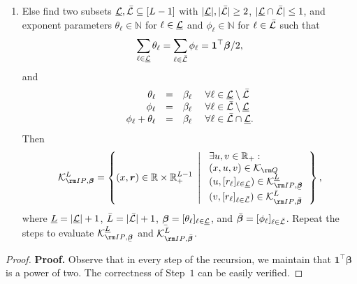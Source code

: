 \documentclass[mnsc, nonblindrev]{informswp}
\newcommand{\1}[1]{\mathds{1}{\left(#1\right)}}
\begin{document}
\begin{appendices}
\begin{theorem}
\begin{enumerate}[Step 1.]
\item Else find two subsets $\underline {\mathcal{L}}, \bar {\mathcal{L}}  \subseteq [L-1]$ with $|\underline {\mathcal{L}}|, |\bar {\mathcal{L}}| \geq 2$, $|\underline {\mathcal{L}} \cap \bar {\mathcal{L}}| \leq 1$, and exponent parameters $\theta_\ell \in \mathbb{N}$ for $\ell \in \underline {\mathcal{L}}$ and $\phi_\ell \in \mathbb{N}$ for $\ell \in \bar {\mathcal{L}}$ such that 
$$
\sum_{\ell \in \underline {\mathcal{L}}} \theta_\ell = \sum_{\ell \in \bar{\mathcal{L}}} \phi_\ell = \bm 1^\top \bm \beta/2,
$$
and
$$
\begin{array}{rcll} 
\theta_\ell &=& \beta_\ell &~\forall \ell \in \underline {\mathcal{L}} \setminus \bar {\mathcal{L}} \\
\phi_\ell &=& \beta_\ell &~\forall \ell \in \bar {\mathcal{L}} \setminus \underline  {\mathcal{L}} \\
\phi_\ell + \theta_\ell &=& \beta_\ell &~\forall \ell \in \bar {\mathcal{L}} \cap  \underline  {\mathcal{L}}.
\end{array}
$$
Then 
$$
\cK^{L}_{{\rm IP},\bm \beta} = \left\{ (x,\bm r) \in \bbr\times \bbr^{L-1}_+ ~\left|~ 
\begin{array}{ll} \exists u,  v \in \bbr_+: \\
(x,u,v) \in \cK_{{\rm Q}} \\
(u, [r_\ell]_{\ell \in \underline \cL}) \in \cK^{\underline L}_{{\rm IP},\bmu \beta} \\
(v, [r_\ell]_{\ell \in \bar \cL}) \in \cK^{\bar L}_{{\rm IP},{\bmb \beta}} \\
\end{array}
\right.\right\},
$$
where $\underline L = | \underline {\mathcal{L}}|+1$, $\bar L = | \bar {\mathcal{L}}|+1$, $\bmu \beta = [\theta_\ell]_{\ell \in \underline \cL}$, and $\bar{\bm{\beta}} = [\phi_\ell]_{\ell \in \bar {\mathcal{L}}}$. Repeat the steps to evaluate $ \cK^{\underline L}_{{\rm IP},\bmu \beta}$ and $\cK^{\bar L}_{{\rm IP},{\bmb \beta}}$.
\end{enumerate}
\end{theorem}
\begin{proof}{\bf Proof.}
Observe that in every step of the recursion, we maintain that $\bm 1^\top \bm \beta$ is a power of two. The correctness of Step~$1$ can be easily verified. 


\end{proof}
\end{appendices}
\end{document}
